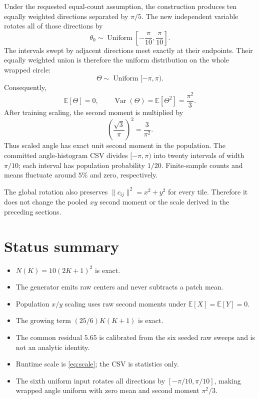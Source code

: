 \documentclass[11pt]{article}
\newcommand{\E}{\mathbb{E}}
\newcommand{\Var}{\operatorname{Var}}
\begin{document}
Under the requested equal-count assumption, the construction produces ten
equally weighted directions separated by \(\pi/5\).  The new independent
variable rotates all of those directions by
\[
  \theta_0\sim\operatorname{Uniform}
  \left[-\frac{\pi}{10},\frac{\pi}{10}\right].
\]
The intervals swept by adjacent directions meet exactly at their endpoints.
Their equally weighted union is therefore the uniform distribution on the
whole wrapped circle:
\[
  \Theta\sim\operatorname{Uniform}[-\pi,\pi).
\]
Consequently,
\[
  \E[\Theta]=0,\qquad
  \Var(\Theta)=\E[\Theta^2]=\frac{\pi^2}{3}.
\]
After training scaling, the second moment is multiplied by
\[
  \left(\frac{\sqrt3}{\pi}\right)^2=\frac3{\pi^2}.
\]
Thus scaled angle has exact unit second moment in the population.  The
committed angle-histogram CSV divides
\([-\pi,\pi)\) into twenty intervals of width \(\pi/10\); each interval has
population probability \(1/20\).  Finite-sample counts and means fluctuate
around \(5\%\) and zero, respectively.

The global rotation also preserves \(\|c_{ij}\|^2=x^2+y^2\) for every tile.
Therefore it does not change the pooled \(xy\) second moment or the scale
derived in the preceding sections.

\section{Status summary}

\begin{itemize}
  \item \(N(K)=10(2K+1)^2\) is exact.
  \item The generator emits raw centers and never subtracts a patch mean.
  \item Population \(x/y\) scaling uses raw second moments under
    \(\E[X]=\E[Y]=0\).
  \item The growing term \((25/6)K(K+1)\) is exact.
  \item The common residual \(5.65\) is calibrated from the six seeded raw
    sweeps and is not an analytic identity.
  \item Runtime scale is \eqref{eq:scale}; the CSV is statistics only.
  \item The sixth uniform input rotates all directions by
    \([-\pi/10,\pi/10]\), making wrapped angle uniform with zero mean and
    second moment \(\pi^2/3\).
\end{itemize}
\end{document}
